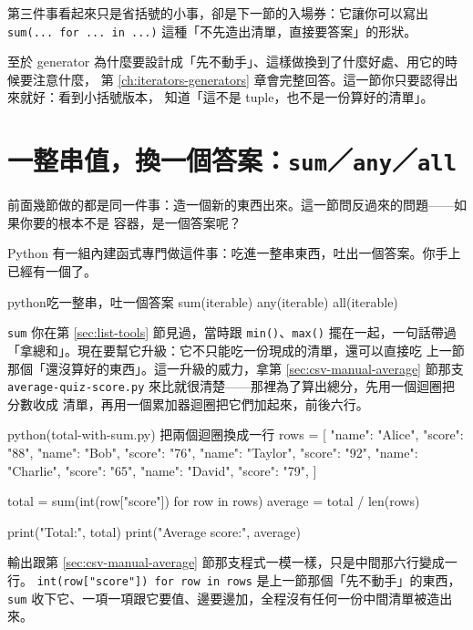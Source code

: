 第三件事看起來只是省括號的小事，卻是下一節的入場券：它讓你可以寫出
\texttt{sum(...\ for ...\ in ...)} 這種「不先造出清單，直接要答案」的形狀。

至於 generator 為什麼要設計成「先不動手」、這樣做換到了什麼好處、用它的時候要注意什麼，
第 \ref{ch:iterators-generators} 章會完整回答。這一節你只要認得出來就好：看到小括號版本，
知道「這不是 tuple，也不是一份算好的清單」。

\section{一整串值，換一個答案：\texttt{sum}／\texttt{any}／\texttt{all}}
\label{sec:reducing-builtins}

前面幾節做的都是同一件事：造一個新的東西出來。這一節問反過來的問題——如果你要的根本不是
容器，是一個答案呢？

Python 有一組內建函式專門做這件事：吃進一整串東西，吐出一個答案。你手上已經有一個了。

\begin{code}{python}{吃一整串，吐一個答案}
sum(iterable)
any(iterable)
all(iterable)
\end{code}

\texttt{sum} 你在第 \ref{sec:list-tools} 節見過，當時跟 \texttt{min()}、\texttt{max()}
擺在一起，一句話帶過「拿總和」。現在要幫它升級：它不只能吃一份現成的清單，還可以直接吃
上一節那個「還沒算好的東西」。這一升級的威力，拿第 \ref{sec:csv-manual-average} 節那支
\texttt{average-quiz-score.py} 來比就很清楚——那裡為了算出總分，先用一個迴圈把分數收成
清單，再用一個累加器迴圈把它們加起來，前後六行。

\begin{example}{python}{(total-with-sum.py) 把兩個迴圈換成一行}
rows = [
    {"name": "Alice", "score": "88"},
    {"name": "Bob", "score": "76"},
    {"name": "Taylor", "score": "92"},
    {"name": "Charlie", "score": "65"},
    {"name": "David", "score": "79"},
]

total = sum(int(row["score"]) for row in rows)
average = total / len(rows)

print("Total:", total)
print("Average score:", average)
\end{example}


輸出跟第 \ref{sec:csv-manual-average} 節那支程式一模一樣，只是中間那六行變成一行。
\texttt{int(row["score"]) for row in rows} 是上一節那個「先不動手」的東西，
\texttt{sum} 收下它、一項一項跟它要值、邊要邊加，全程沒有任何一份中間清單被造出來。

